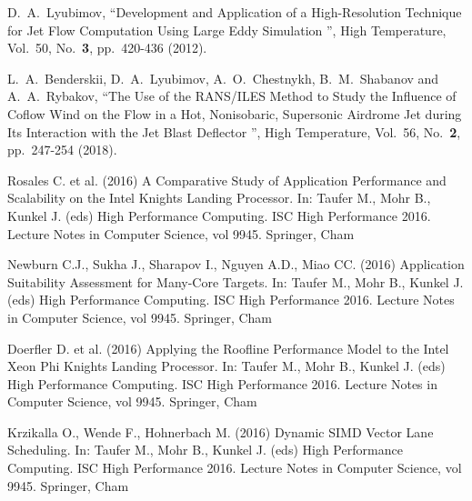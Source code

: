 \documentclass[
11pt,%
tightenlines,%
twoside,%
onecolumn,%
nofloats,%
nobibnotes,%
nofootinbib,%
superscriptaddress,%
noshowpacs,%
centertags]%
{revtex4}
\begin{document}
\begin{thebibliography}{99}




D.~A.~Lyubimov, \textquotedblleft Development and Application of a High-Resolution Technique for Jet Flow Computation Using Large Eddy Simulation \textquotedblright, High Temperature, Vol.~50, No.~\textbf{3}, pp.~420-436 (2012).

L.~A.~Benderskii, D.~A.~Lyubimov, A.~O.~Chestnykh, B.~M.~Shabanov and A.~A.~Rybakov, \textquotedblleft The Use of the RANS/ILES Method to Study the Influence of Coflow Wind on the Flow in a Hot, Nonisobaric, Supersonic Airdrome Jet during Its Interaction with the Jet Blast Deflector \textquotedblright, High Temperature, Vol.~56, No.~\textbf{2}, pp.~247-254 (2018).



Rosales C. et al. (2016) A Comparative Study of Application Performance and Scalability on the Intel Knights Landing Processor. In: Taufer M., Mohr B., Kunkel J. (eds) High Performance Computing. ISC High Performance 2016. Lecture Notes in Computer Science, vol 9945. Springer, Cham

Newburn C.J., Sukha J., Sharapov I., Nguyen A.D., Miao CC. (2016) Application Suitability Assessment for Many-Core Targets. In: Taufer M., Mohr B., Kunkel J. (eds) High Performance Computing. ISC High Performance 2016. Lecture Notes in Computer Science, vol 9945. Springer, Cham

Doerfler D. et al. (2016) Applying the Roofline Performance Model to the Intel Xeon Phi Knights Landing Processor. In: Taufer M., Mohr B., Kunkel J. (eds) High Performance Computing. ISC High Performance 2016. Lecture Notes in Computer Science, vol 9945. Springer, Cham

Krzikalla O., Wende F., Hohnerbach M. (2016) Dynamic SIMD Vector Lane Scheduling. In: Taufer M., Mohr B., Kunkel J. (eds) High Performance Computing. ISC High Performance 2016. Lecture Notes in Computer Science, vol 9945. Springer, Cham


\end{thebibliography}
\end{document}
